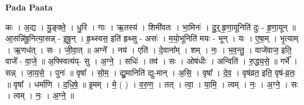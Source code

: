 \documentclass[17pt]{extarticle}
\begin{document}
\textbf{Pada Paata} \newline

कः । अ॒द्य । यु॒ङ्क्ते॒ । धु॒रि । गाः । ऋ॒तस्य॑ । शिमी॑वतः । भा॒मिनः॑ । दु॒र्॒.हृ॒णा॒यूनिति॑ दुः - हृ॒णा॒यून् ॥ आ॒सन्नि॑षू॒नित्या॒सन्न् - इ॒षू॒न् । हृ॒थ्स्वस॒ इति॑ हृथ्सु - असः॑ । म॒यो॒भूनिति॑ मयः - भून् । यः । ए॒षा॒म् । भृ॒त्याम् । ऋ॒णध॑त् । सः । जी॒वा॒त् ॥ अग्ने᳚ । नय॑ । एति॑ । दे॒वाना᳚म् । शम् । नः॒ । भ॒व॒न्तु॒ । वाजे॑वाज॒ इति॒ वाजे᳚ - वा॒जे॒ ॥ अ॒फ्स्वित्य॑प्- सु । अ॒ग्ने॒ । सधिः॑ । तव॑ । सः । ओष॑धीः । अन्विति॑ । रु॒द्ध्य॒से॒ ॥ गर्भे᳚ । सन्न् । जा॒य॒से॒ । पुनः॑ ॥ वृषा᳚ । सो॒म॒ । द्यु॒मानिति॑ द्यु-मान् । अ॒सि॒ । वृषा᳚ । दे॒व॒ । वृष॑व्रत॒ इति॒ वृष॑-व्र॒तः॒ ॥ वृषा᳚ । धर्मा॑णि । द॒धि॒षे॒ ॥ इ॒मम् । मे॒ ( ) । व॒रु॒ण॒ । तत् । त्वा॒ । या॒मि॒ । त्वम् । नः॒ । अ॒ग्ने॒ । सः । त्वम् । नः॒ । अ॒ग्ने॒ ॥  \newline
\end{document}
